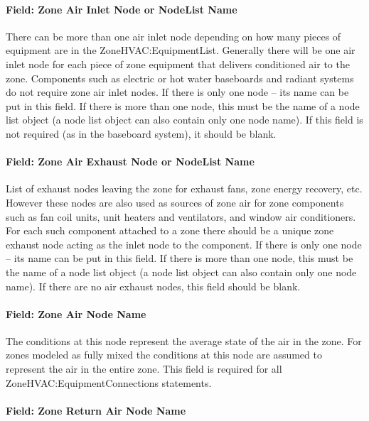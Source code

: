 \paragraph{Field: Zone Air Inlet Node or NodeList Name}\label{field-zone-air-inlet-node-or-nodelist-name}

There can be more than one air inlet node depending on how many pieces of equipment are in the ZoneHVAC:EquipmentList. Generally there will be one air inlet node for each piece of zone equipment that delivers conditioned air to the zone. Components such as electric or hot water baseboards and radiant systems do not require zone air inlet nodes. If there is only one node -- its name can be put in this field. If there is more than one node, this must be the name of a node list object (a node list object can also contain only one node name). If this field is not required (as in the baseboard system), it should be blank.

\paragraph{Field: Zone Air Exhaust Node or NodeList Name}\label{field-zone-air-exhaust-node-or-nodelist-name}

List of exhaust nodes leaving the zone for exhaust fans, zone energy recovery, etc. However these nodes are also used as sources of zone air for zone components such as fan coil units, unit heaters and ventilators, and window air conditioners. For each such component attached to a zone there should be a unique zone exhaust node acting as the inlet node to the component. If there is only one node -- its name can be put in this field. If there is more than one node, this must be the name of a node list object (a node list object can also contain only one node name). If there are no air exhaust nodes, this field should be blank.

\paragraph{Field: Zone Air Node Name}\label{field-zone-air-node-name}

The conditions at this node represent the average state of the air in the zone. For zones modeled as fully mixed the conditions at this node are assumed to represent the air in the entire zone. This field is required for all ZoneHVAC:EquipmentConnections statements.

\paragraph{Field: Zone Return Air Node Name}\label{field-zone-return-air-node-name}

